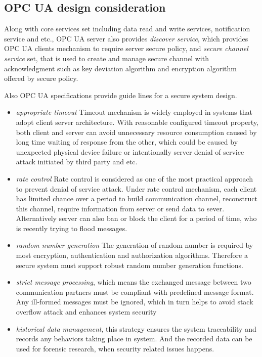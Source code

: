 \subsection{OPC UA design consideration}
Along with core services set including data read and write services, notification service and etc., OPC UA server also provides \emph{discover service}\cite{O4}, which provides OPC UA clients mechanism to require server secure policy, and \emph{secure channel service} set\cite{O4}, that is used to create and manage secure channel with acknowledgment such as key deviation algorithm and encryption algorithm offered by secure policy. 

Also OPC UA specifications provide guide lines for a secure system design\cite{O4}.
\begin{itemize}
\item \emph{appropriate timeout} Timeout mechanism is widely employed in systems that adopt client server architecture. With reasonable configured timeout property, both client and server can avoid unnecessary resource consumption caused by long time waiting of response from the other, which could be caused by unexpected physical device failure or intentionally server denial of service attack initiated by third party and etc. 
\item \emph{rate control} Rate control is considered as one of the most practical approach to prevent denial of service attack. Under rate control mechanism, each client has limited chance over a period to build communication channel, reconstruct this channel, require information from server or send data to sever. Alternatively server can also ban or block the client for a period of time, who is recently trying to flood messages. 
\item \emph{random number generation} The generation of random number is required by most encryption, authentication and authorization algorithms. Therefore a secure system must support robust random number generation functions.
\item \emph{strict message processing}, which means the exchanged message between two communication partners must be compliant with predefined message format. Any ill-formed messages must be ignored, which in turn helps to avoid stack overflow attack and enhances system security
\item \emph{historical data management}, this strategy ensures the system traceability and records any behaviors taking place in system. And the recorded data can be used for forensic research, when security related issues happens.
\end{itemize}
